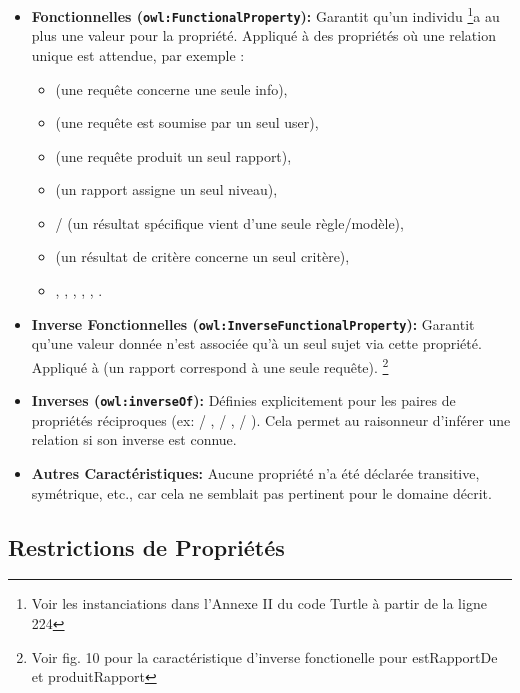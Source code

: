\documentclass[9pt,twocolumn,twoside,french]{article}
\begin{document}
\begin{itemize}
    \item \textbf{Fonctionnelles (\texttt{owl:FunctionalProperty}):} Garantit qu'un individu \footnote{Voir les instanciations dans l'Annexe II du code Turtle à partir de la ligne 224}a au plus une valeur pour la propriété. Appliqué à des propriétés où une relation unique est attendue, par exemple :
        \begin{itemize}
            \item {} (une requête concerne une seule info),
            \item {} (une requête est soumise par un seul user),
            \item {} (une requête produit un seul rapport),
            \item {} (un rapport assigne un seul niveau),
            \item {} /  (un résultat spécifique vient d'une seule règle/modèle),
            \item {} (un résultat de critère concerne un seul critère),
            \item {}, , , , , .
        \end{itemize}
    \item \textbf{Inverse Fonctionnelles (\texttt{owl:InverseFunctionalProperty}):} Garantit qu'une valeur donnée n'est associée qu'à un seul sujet via cette propriété. Appliqué à  (un rapport correspond à une seule requête). \footnote{Voir fig. 10 pour la caractéristique d'inverse fonctionelle pour estRapportDe et produitRapport}
    \item \textbf{Inverses (\texttt{owl:inverseOf}):} Définies explicitement pour les paires de propriétés réciproques (ex:  / ,  / ,  / ). Cela permet au raisonneur d'inférer une relation si son inverse est connue.
    \item \textbf{Autres Caractéristiques:} Aucune propriété n'a été déclarée transitive, symétrique, etc., car cela ne semblait pas pertinent pour le domaine décrit.
\end{itemize}

\subsection{Restrictions de Propriétés}
\end{document}
